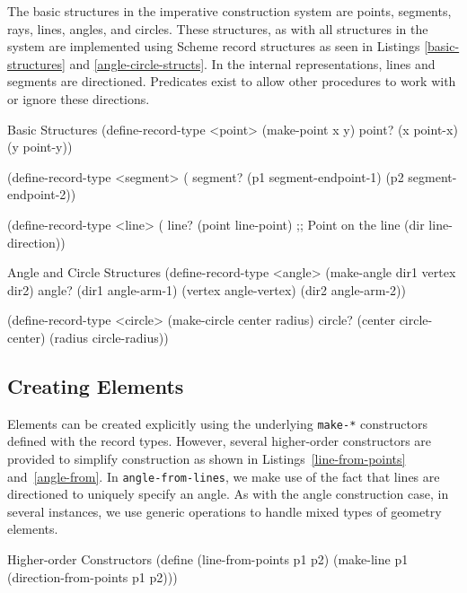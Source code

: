 The basic structures in the imperative construction system are points,
segments, rays, lines, angles, and circles. These structures, as with
all structures in the system are implemented using Scheme record
structures as seen in Listings \ref{basic-structures} and
\ref{angle-circle-structs}. In the internal representations, lines and
segments are directioned. Predicates exist to allow other procedures
to work with or ignore these directions.

\begin{code-listing}
[label=basic-structures]
{Basic Structures}
(define-record-type <point>
  (make-point x y)
  point?
  (x point-x)
  (y point-y))

(define-record-type <segment>
  (%
  segment?
  (p1 segment-endpoint-1)
  (p2 segment-endpoint-2))

(define-record-type <line>
  (%
  line?
  (point line-point) ;; Point on the line
  (dir line-direction))
\end{code-listing}

\begin{code-listing}
[label=angle-circle-structs]
{Angle and Circle Structures}
(define-record-type <angle>
  (make-angle dir1 vertex dir2)
  angle?
  (dir1 angle-arm-1)
  (vertex angle-vertex)
  (dir2 angle-arm-2))

(define-record-type <circle>
  (make-circle center radius)
  circle?
  (center circle-center)
  (radius circle-radius))
\end{code-listing}

\subsection{Creating Elements}

Elements can be created explicitly using the underlying
\texttt{make-*} constructors defined with the record types. However,
several higher-order constructors are provided to simplify
construction as shown in Listings~\ref{line-from-points}
and~\ref{angle-from}.  In \texttt{angle-from-lines}, we make use of
the fact that lines are directioned to uniquely specify an angle.  As
with the angle construction case, in several instances, we use generic
operations to handle mixed types of geometry elements.

\begin{code-listing}
[label=line-from-points]
{Higher-order Constructors}
(define (line-from-points p1 p2)
  (make-line p1 (direction-from-points p1 p2)))

\end{code-listing}

